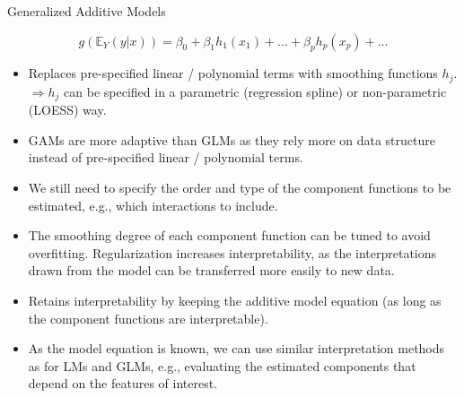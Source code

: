 \documentclass[11pt,compress,t,notes=noshow, aspectratio=169, xcolor=table]{beamer}
\begin{document}
\begin{frame}{Generalized Additive Models}

$$
g\left(\mathbb{E}_Y(y \vert x)\right) = \beta_0 + \beta_1 h_1(x_1) + \dots + \beta_p h_p(x_p) + \dots
$$
\begin{itemize}
\item Replaces pre-specified linear / polynomial terms with smoothing functions $h_j$.\\
$\Rightarrow h_j$ can be specified in a parametric (regression spline) or non-parametric (LOESS) way.
\item GAMs are more adaptive than GLMs as they rely more on data structure instead of pre-specified linear / polynomial terms. %
\item We still need to specify the order and type of the component functions to be estimated, e.g., which interactions to include.
\item The smoothing degree of each component function can be tuned to avoid overfitting. Regularization increases interpretability, as the interpretations drawn from the model can be transferred more easily to new data.
\item Retains interpretability by keeping the additive model equation (as long as the component functions are interpretable).
\item
As the model equation is known, we can use similar interpretation methods as for LMs and GLMs, e.g., evaluating the estimated components that depend on the features of interest.
\end{itemize}
\end{frame}
\end{document}
